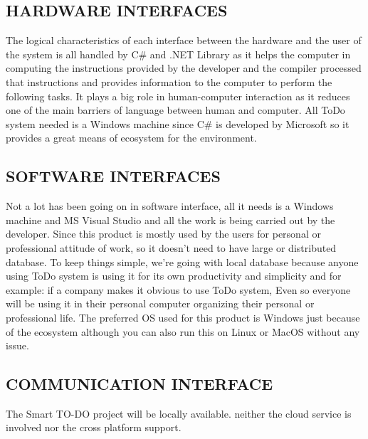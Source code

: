 \documentclass[12pt, a4paper]{report}
\begin{document}
\subsection{HARDWARE INTERFACES }
The logical characteristics of each interface between the hardware and the user of the system is all handled by C\# and .NET Library as it helps the computer in computing the instructions provided by the developer and the compiler processed that instructions and provides information to the computer to perform the following tasks. It plays a big role in human-computer interaction as it reduces one of the main barriers of language between human and computer.	\newline All ToDo system needed is a Windows machine since C\# is developed by Microsoft so it provides a great means of ecosystem for the environment.
\subsection{SOFTWARE INTERFACES  }
Not a lot has been going on in software interface, all it needs is a Windows machine and MS Visual Studio and all the work is being carried out by the developer. Since this product is mostly used by the users for personal or professional attitude of work, so it doesn’t need to have large or distributed database. To keep things simple, we’re going with local database because anyone using ToDo system is using it for its own productivity and simplicity and for example: if a company makes it obvious to use ToDo system, Even so everyone will be using it in their personal computer organizing their personal or professional life. \newline The preferred OS used for this product is Windows just because of the ecosystem although you can also run this on Linux or MacOS without any issue.
\subsection{COMMUNICATION INTERFACE }
The Smart TO-DO project  will be locally available. neither the cloud service is involved nor the cross platform support.
\end{document}
